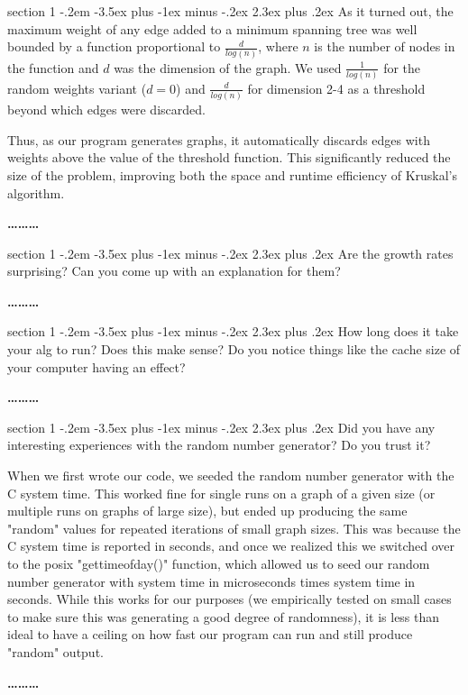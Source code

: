 \documentclass[12pt]{article}
\makeatletter
\newenvironment{problem}{\@startsection
       {section}
       {1}
       {-.2em}
       {-3.5ex plus -1ex minus -.2ex}
       {2.3ex plus .2ex}
       {\pagebreak[3]%
       \large\bf\noindent{Problem }
       }
       }
       {%
       \begin{center}\large\bf \ldots\ldots\ldots\end{center}}
\makeatother
\begin{document}
\begin{problem}{}
As it turned out, the maximum weight of any edge added to a minimum spanning tree was well bounded by a function proportional to $\frac{d}{log(n)}$, where $n$ is the number of nodes in the function and $d$ was the dimension of the graph. We used $\frac{1}{log(n)}$ for the random weights variant ($d=0$) and $\frac{d}{log(n)}$ for dimension 2-4 as a threshold beyond which edges were discarded.

Thus, as our program generates graphs, it automatically discards edges with weights above the value of the threshold function.  This significantly reduced the size of the problem, improving both the space and runtime efficiency of Kruskal's algorithm.

\end{problem}

\begin{problem}{}
Are the growth rates surprising? Can you come up with an explanation
for them?

\end{problem}

\begin{problem}{}
How long does it take your alg to run? Does this make sense? Do you
notice things like the cache size of your computer having an effect?

\end{problem}

\begin{problem}{}
Did you have any interesting experiences with the random number
generator? Do you trust it?

When we first wrote our code, we seeded the random number generator with the C system time.  This worked fine for single runs on a graph of a given size (or multiple runs on graphs of large size), but ended up producing the same "random" values for repeated iterations of small graph sizes.  This was because the C system time is reported in seconds, and once we realized this we switched over to the posix "gettimeofday()" function, which allowed us to seed our random number generator with system time in microseconds times system time in seconds.  While this works for our purposes (we empirically tested on small cases to make sure this was generating a good degree of randomness), it is less than ideal to have a ceiling on how fast our program can run and still produce "random" output.  

\end{problem}

\end{document}
